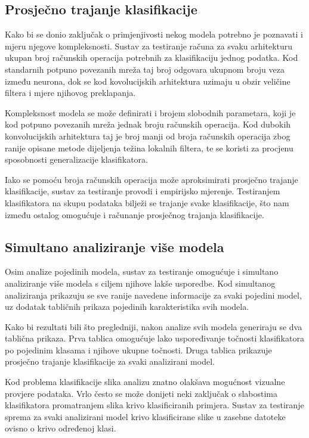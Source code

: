 \documentclass[lmodern, utf8, diplomski, numeric]{fer}
\begin{document}
\subsection{Prosječno trajanje klasifikacije}

Kako bi se donio zaključak o primjenjivosti nekog modela potrebno je poznavati i mjeru njegove kompleksnosti. Sustav za testiranje računa za svaku arhitekturu ukupan broj računskih operacija potrebnih za klasifikaciju jednog podatka. Kod standarnih potpuno povezanih mreža taj broj odgovara ukupnom broju veza između neurona, dok se kod kovolucijskih arhitektura uzimaju u obzir veličine filtera i mjere njihovog preklapanja. 

Kompleksnost modela se može definirati i brojem slobodnih parametara, koji je kod potpuno povezanih mreža jednak broju računskih operacija. Kod dubokih konvolucijskih arhitektura taj je broj manji od broja računskih operacija zbog ranije opisane metode dijeljenja težina lokalnih filtera, te se koristi za procjenu sposobnosti generalizacije klasifikatora.

Iako se pomoću broja računskih operacija može aproksimirati prosječno trajanje klasifikacije, sustav za testiranje provodi i empirijsko mjerenje. Testiranjem klasifikatora na skupu podataka bilježi se trajanje svake klasifikacije, što nam između ostalog omogućuje i računanje prosječnog trajanja klasifikacije.

\subsection{Simultano analiziranje više modela}

Osim analize pojedinih modela, sustav za testiranje omogućuje i simultano analiziranje više modela s ciljem njihove lakše usporedbe. Kod simultanog analiziranja prikazuju se sve ranije navedene informacije za svaki pojedini model, uz dodatak tabličnih prikaza pojedinih karakteristika svih modela. 

Kako bi rezultati bili što pregledniji, nakon analize svih modela generiraju se dva tablična prikaza. Prva tablica omogućuje lako uspoređivanje točnosti klasifikatora po pojedinim klasama i njihove ukupne točnosti. Druga tablica prikazuje prosječno trajanje klasifikacije za svaki analizirani model. 

Kod problema klasifikacije slika analizu znatno olakšava mogućnost vizualne provjere podataka. Vrlo često se može donijeti neki zaključak o slabostima klasifikatora promatranjem slika krivo klasificiranih primjera. Sustav za testiranje sprema za svaki analizirani model krivo klasificirane slike u zasebne datoteke ovisno o krivo određenoj klasi.
\end{document}
